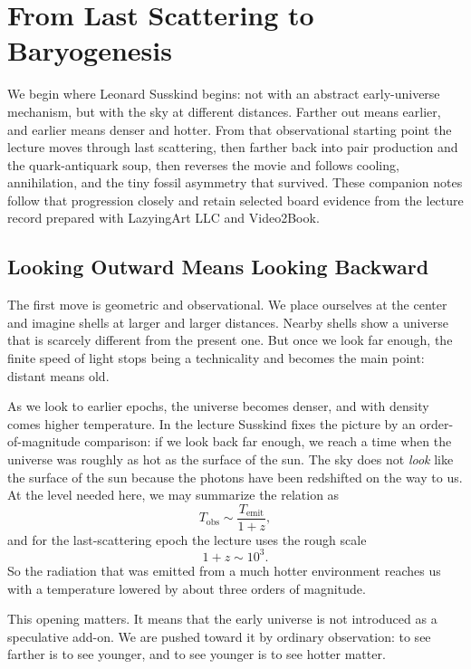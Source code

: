 \chapter{From Last Scattering to Baryogenesis}

We begin where Leonard Susskind begins: not with an abstract early-universe mechanism, but with the sky at different distances. Farther out means earlier, and earlier means denser and hotter. From that observational starting point the lecture moves through last scattering, then farther back into pair production and the quark-antiquark soup, then reverses the movie and follows cooling, annihilation, and the tiny fossil asymmetry that survived. These companion notes follow that progression closely and retain selected board evidence from the lecture record prepared with LazyingArt LLC and Video2Book.

\section{Looking Outward Means Looking Backward}

The first move is geometric and observational. We place ourselves at the center and imagine shells at larger and larger distances. Nearby shells show a universe that is scarcely different from the present one. But once we look far enough, the finite speed of light stops being a technicality and becomes the main point: distant means old.

As we look to earlier epochs, the universe becomes denser, and with density comes higher temperature. In the lecture Susskind fixes the picture by an order-of-magnitude comparison: if we look back far enough, we reach a time when the universe was roughly as hot as the surface of the sun. The sky does not \emph{look} like the surface of the sun because the photons have been redshifted on the way to us. At the level needed here, we may summarize the relation as
\begin{equation}
T_{\mathrm{obs}} \sim \frac{T_{\mathrm{emit}}}{1+z},
\end{equation}
and for the last-scattering epoch the lecture uses the rough scale
\begin{equation}
1+z \sim 10^3.
\end{equation}
So the radiation that was emitted from a much hotter environment reaches us with a temperature lowered by about three orders of magnitude.

This opening matters. It means that the early universe is not introduced as a speculative add-on. We are pushed toward it by ordinary observation: to see farther is to see younger, and to see younger is to see hotter matter.

